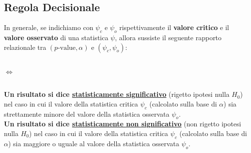 \documentclass[compress, xcolor=table]{beamer}
\begin{document}
\subsection{Regola Decisionale}
\begin{frame}
	\small
	\begin{block}{}
		In generale, se indichiamo con $\psi_c$ e $\psi_o$ rispettivamente il \textbf{valore critico} e il \textbf{valore osservato} di una statistica $\psi$, allora sussiste il seguente rapporto relazionale tra $(p\text{-value}, \alpha)$ e $(\psi_c, \psi_o)$:
	\end{block}
	
	\vspace{0.3cm}
	
	\begin{columns}[T]
		\centering
		
		\vspace*{5mm}
		\centering
		\Large $\Leftrightarrow$
		
		\centering
	\end{columns}
	
	\vspace{0.5cm}
	
	\begin{block}{}
		\textbf{Un risultato si dice \underline{statisticamente significativo}} (rigetto ipotesi nulla $H_0$) nel caso in cui il valore della statistica critica $\psi_c$ (calcolato sulla base di $\alpha$) sia strettamente minore del valore della statistica osservata $\psi_o$. \\[6pt]
		\textbf{Un risultato si dice \underline{statisticamente non significativo}} (non rigetto ipotesi nulla $H_0$) nel caso in cui il valore della statistica critica $\psi_c$ (calcolato sulla base di $\alpha$) sia maggiore o uguale al valore della statistica osservata $\psi_o$.
	\end{block}
	
\end{frame}
\end{document}
